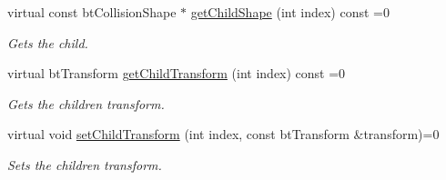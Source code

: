 \begin{DoxyCompactItemize}
\mbox{\label{classbtGImpactShapeInterface_a0f89806a197c690e295ba0f60559b015}} 
virtual const bt\+Collision\+Shape $\ast$ \hyperlink{classbtGImpactShapeInterface_a0f89806a197c690e295ba0f60559b015}{get\+Child\+Shape} (int index) const =0
\begin{DoxyCompactList}\small\item\em Gets the child. \end{DoxyCompactList}\item 
\mbox{\label{classbtGImpactShapeInterface_ac06b1f597e2b628bf1e0523ab1c62d08}} 
virtual bt\+Transform \hyperlink{classbtGImpactShapeInterface_ac06b1f597e2b628bf1e0523ab1c62d08}{get\+Child\+Transform} (int index) const =0
\begin{DoxyCompactList}\small\item\em Gets the children transform. \end{DoxyCompactList}\item 
virtual void \hyperlink{classbtGImpactShapeInterface_a83392f97bd7dfeb71ccdce6913a465b0}{set\+Child\+Transform} (int index, const bt\+Transform \&transform)=0
\begin{DoxyCompactList}\small\item\em Sets the children transform. \end{DoxyCompactList}\end{DoxyCompactItemize}

